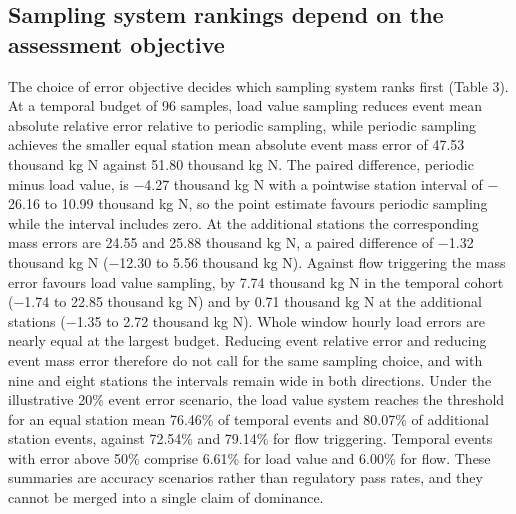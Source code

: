 \documentclass[pdflatex,sn-mathphys-num]{sn-jnl}%
\theoremstyle{thmstyleone}%
\theoremstyle{thmstyletwo}%
\theoremstyle{thmstylethree}%
\begin{document}
\subsection{Sampling system rankings depend on the assessment objective}

The choice of error objective decides which sampling system ranks first (Table 3). At a temporal budget of 96 samples, load value sampling reduces event mean absolute relative error relative to periodic sampling, while periodic sampling achieves the smaller equal station mean absolute event mass error of 47.53 thousand kg N against 51.80 thousand kg N. The paired difference, periodic minus load value, is $-$4.27 thousand kg N with a pointwise station interval of $-$26.16 to 10.99 thousand kg N, so the point estimate favours periodic sampling while the interval includes zero. At the additional stations the corresponding mass errors are 24.55 and 25.88 thousand kg N, a paired difference of $-$1.32 thousand kg N ($-$12.30 to 5.56 thousand kg N). Against flow triggering the mass error favours load value sampling, by 7.74 thousand kg N in the temporal cohort ($-$1.74 to 22.85 thousand kg N) and by 0.71 thousand kg N at the additional stations ($-$1.35 to 2.72 thousand kg N). Whole window hourly load errors are nearly equal at the largest budget. Reducing event relative error and reducing event mass error therefore do not call for the same sampling choice, and with nine and eight stations the intervals remain wide in both directions. Under the illustrative 20\% event error scenario, the load value system reaches the threshold for an equal station mean 76.46\% of temporal events and 80.07\% of additional station events, against 72.54\% and 79.14\% for flow triggering. Temporal events with error above 50\% comprise 6.61\% for load value and 6.00\% for flow. These summaries are accuracy scenarios rather than regulatory pass rates, and they cannot be merged into a single claim of dominance.
\end{document}
